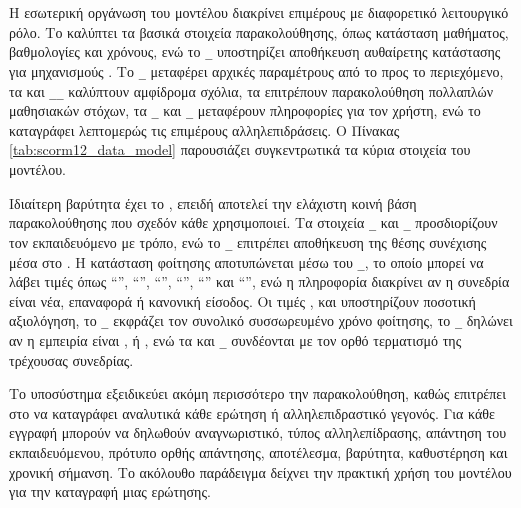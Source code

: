 Η εσωτερική οργάνωση του μοντέλου διακρίνει επιμέρους  με διαφορετικό λειτουργικό ρόλο. Το \texttt{} καλύπτει τα βασικά στοιχεία παρακολούθησης, όπως κατάσταση μαθήματος, βαθμολογίες και χρόνους, ενώ το \texttt{\_} υποστηρίζει αποθήκευση αυθαίρετης κατάστασης για μηχανισμούς . Το \texttt{\_} μεταφέρει αρχικές παραμέτρους από το  προς το περιεχόμενο, τα \texttt{} και \texttt{\_\_} καλύπτουν αμφίδρομα σχόλια, τα \texttt{} επιτρέπουν παρακολούθηση πολλαπλών μαθησιακών στόχων, τα \texttt{\_} και \texttt{\_} μεταφέρουν πληροφορίες για τον χρήστη, ενώ το \texttt{} καταγράφει λεπτομερώς τις επιμέρους αλληλεπιδράσεις. Ο Πίνακας \ref{tab:scorm12_data_model} παρουσιάζει συγκεντρωτικά τα κύρια στοιχεία του μοντέλου.



Ιδιαίτερη βαρύτητα έχει το \texttt{}, επειδή αποτελεί την ελάχιστη κοινή βάση παρακολούθησης που σχεδόν κάθε  χρησιμοποιεί. Τα στοιχεία \texttt{\_} και \texttt{\_} προσδιορίζουν τον εκπαιδευόμενο με  τρόπο, ενώ το \texttt{\_} επιτρέπει αποθήκευση της θέσης συνέχισης μέσα στο . Η κατάσταση φοίτησης αποτυπώνεται μέσω του \texttt{\_}, το οποίο μπορεί να λάβει τιμές όπως ``'', ``'', ``'', ``'', ``'' και ``'', ενώ η πληροφορία \texttt{} διακρίνει αν η συνεδρία είναι νέα, επαναφορά ή κανονική είσοδος. Οι τιμές \texttt{}, \texttt{} και \texttt{} υποστηρίζουν ποσοτική αξιολόγηση, το \texttt{\_} εκφράζει τον συνολικό συσσωρευμένο χρόνο φοίτησης, το \texttt{\_} δηλώνει αν η εμπειρία είναι ,  ή , ενώ τα \texttt{} και \texttt{\_} συνδέονται με τον ορθό τερματισμό της τρέχουσας συνεδρίας.

Το υποσύστημα \texttt{} εξειδικεύει ακόμη περισσότερο την παρακολούθηση, καθώς επιτρέπει στο  να καταγράφει αναλυτικά κάθε ερώτηση ή αλληλεπιδραστικό γεγονός. Για κάθε εγγραφή μπορούν να δηλωθούν αναγνωριστικό, τύπος αλληλεπίδρασης, απάντηση του εκπαιδευόμενου, πρότυπο ορθής απάντησης, αποτέλεσμα, βαρύτητα, καθυστέρηση και χρονική σήμανση. Το ακόλουθο παράδειγμα δείχνει την πρακτική χρήση του μοντέλου για την καταγραφή μιας ερώτησης.

